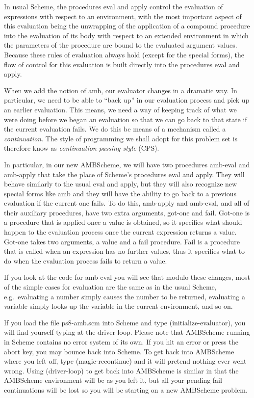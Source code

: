 In usual {\sc Scheme}, the procedures {\cf eval} and {\cf apply} control
the evaluation of expressions with respect to an environment, with the
most important aspect of this evaluation being the unwrapping of the
application of a compound procedure into the evaluation of its body
with respect to an extended environment in which the parameters of
the procedure are bound to the evaluated argument values.  Because
these rules of evaluation always hold (except for the special forms),
the flow of control for this evaluation is built directly into the procedures
{\cf eval} and {\cf apply}.  

When we add the notion of {\cf amb}, our
evaluator changes in a dramatic way.  In particular, we need to be able
to ``back up'' in our evaluation process and pick up an earlier
evaluation.  This means, we need a way of keeping track of what we were
doing before we began an evaluation so that we can go back to that
state if the current evaluation fails.  We do this be means of a
mechanism called a {\it continuation}. The style of programming we shall adopt
for this problem set is therefore know as {\it continuation passing style}
(CPS).

In particular, in our new {\sc AMBScheme}, we will have two procedures {\cf
amb-eval} and {\cf amb-apply} that take the place of {\sc Scheme}'s
procedures {\cf eval} and {\cf apply}.  They will behave similarly to
the usual {\cf eval} and {\cf apply}, but they will also recognize
new special forms like {\cf amb} and they will have the ability to go
back to a previous evaluation if the current one fails.  To do this,
{\cf amb-apply} and {\cf amb-eval}, and all of their auxiliary
procedures, have two extra arguments, {\cf got-one} and {\cf
fail}.  {\cf Got-one} is a procedure that is applied once a value is
obtained, so it specifies what should happen to the evaluation process
once the current expression returns a value.  {\cf Got-one} takes two
arguments, a {\cf value} and a {\cf fail} procedure.  {\cf Fail} is a
procedure that is called when an expression has no further values,
thus it specifies what to do when the evaluation process fails to
return a value.

If you look at the code for {\cf amb-eval}  you will see that modulo
these changes, most of the simple cases for evaluation are the same as
in the usual {\sc Scheme}, e.g.~evaluating a number simply causes the
number to be returned, evaluating a variable simply looks up the
variable in the current environment, and so on.

If you load the file {\cf ps8-amb.scm} into {\sc Scheme} and type {\cf
(initialize-evaluator)}, you will find yourself typing at the driver
loop.  Please note that {\sc AMBScheme} running in {\sc Scheme} contains no
error system of its own.  If you hit an error or press the {\sc abort}
key, you may bounce back into {\sc Scheme}. To get back into {\sc AMBScheme}
where you left off, type {\cf (magic-recontinue)} and it will pretend nothing
ever went wrong. Using {\cf (driver-loop)} to get back into {\sc AMBScheme} is
similar in that the {\sc AMBScheme} environment will be as you left it, but all
your pending fail continuations will be lost so you will be starting on a new
{\sc AMBScheme} problem.

